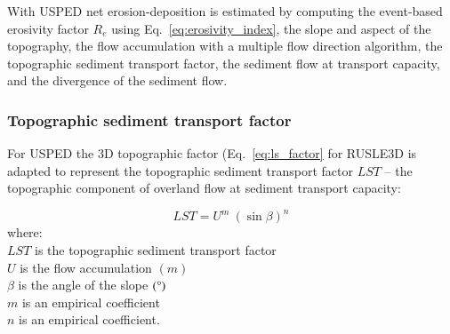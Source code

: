 \documentclass[final,3p,times,twocolumn]{elsarticle}
\begin{document}
With USPED net erosion-deposition is estimated by computing
the event-based erosivity factor $R_e$ using Eq.~\ref{eq:erosivity_index},
the slope and aspect of the topography,
the flow accumulation with a multiple flow direction algorithm,
the topographic sediment transport factor,
the sediment flow at transport capacity,
and the divergence of the sediment flow. 


\subsubsection{Topographic sediment transport factor}
For USPED
the 3D topographic factor (Eq.~\ref{eq:ls_factor} for RUSLE3D 
is adapted to represent the topographic sediment transport factor $LST$ --
the topographic component 
of overland flow at sediment transport capacity:

\begin{equation}
\label{eq:lst_factor}
{LST = U^{m} ~ (\sin \beta)^{n}}
\end{equation}
%
{\small
\noindent
where: \\
\noindent
\hspace*{0.5em} $LST$ is the topographic sediment transport factor\\
\hspace*{0.5em} $U$ is the flow accumulation $(m)$\\
\hspace*{0.5em} $\beta$ is the angle of the slope $(\degree)$\\
\hspace*{0.5em} $m$ is an empirical coefficient\\
\hspace*{0.5em} $n$ is an empirical coefficient.\\
}
\end{document}
